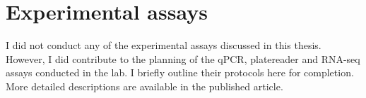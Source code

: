 \documentclass{SBCbookchapter}
\begin{document}
\section{Experimental assays}
I did not conduct any of the experimental assays discussed in this thesis. However, I did contribute to the planning of the qPCR, platereader and RNA-seq assays conducted in the lab. I briefly outline their protocols here for completion. More detailed descriptions are available in the published article.



\end{document}
